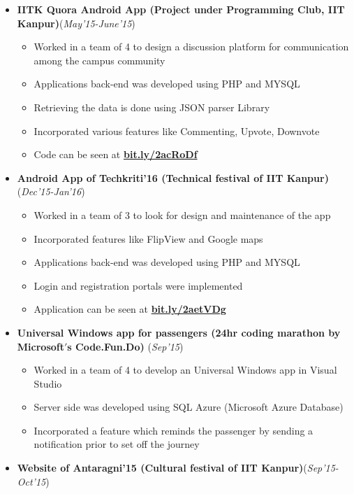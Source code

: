 \documentclass[11pt]{article}
\begin{document}
\begin{itemize}
\itemsep0em
\item \textbf{IITK Quora Android App (Project under Programming Club, IIT Kanpur)}\hfill \hfill (\textit{May'15-June'15}) 
\begin{itemize}
\itemsep0em
\item Worked in a team of 4 to design a discussion platform for communication among the campus community 
\item Applications back-end  was developed using PHP and MYSQL
\item Retrieving the data is done using JSON parser Library
\item Incorporated various features like Commenting, Upvote, Downvote 
\item Code can be seen at \textbf{\href{http://bit.ly/2acRoDf}{bit.ly/2acRoDf}}
\end{itemize}
\item \textbf{Android App of Techkriti'16 (Technical festival of IIT Kanpur)}\hfill \hfill (\textit{Dec'15-Jan'16})
\begin{itemize}
\itemsep0em
\item Worked in a team of 3 to look for design and maintenance of the app
\item Incorporated features like FlipView and Google maps
\item Applications back-end  was developed using PHP and MYSQL
\item Login and registration portals were implemented 
\item Application can be seen at \textbf{\href{http://bit.ly/2aetVDg}{bit.ly/2aetVDg}}
\end{itemize}
\item \textbf{Universal Windows app for passengers (24hr coding marathon by Microsoft$'$s Code.Fun.Do) } \hfill \hfill (\textit{Sep'15})
\begin{itemize}
\itemsep0em
\item  Worked in a team of 4 to develop an Universal Windows app in Visual Studio 
\item Server side was developed using SQL Azure (Microsoft Azure Database)
\item Incorporated a feature which reminds the passenger by sending a notification prior to set off the journey
\end{itemize}
\item \textbf{Website of Antaragni'15 (Cultural festival of IIT Kanpur)}\hfill \hfill (\textit{Sep'15-Oct'15})
\begin{itemize}

\end{itemize}
\end{itemize}
\end{document}
